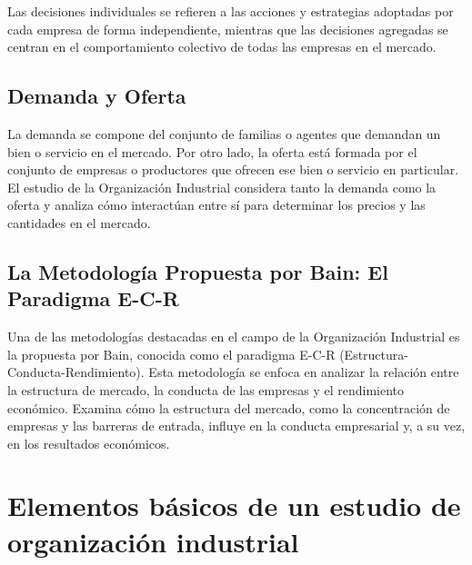 \documentclass[
  letterpaper,
  DIV=11,
  numbers=noendperiod]{scrartcl}
\begin{document}
Las decisiones individuales se refieren a las acciones y estrategias
adoptadas por cada empresa de forma independiente, mientras que las
decisiones agregadas se centran en el comportamiento colectivo de todas
las empresas en el mercado.

\hypertarget{demanda-y-oferta}{%
\subsection{Demanda y Oferta}\label{demanda-y-oferta}}

La demanda se compone del conjunto de familias o agentes que demandan un
bien o servicio en el mercado. Por otro lado, la oferta está formada por
el conjunto de empresas o productores que ofrecen ese bien o servicio en
particular. El estudio de la Organización Industrial considera tanto la
demanda como la oferta y analiza cómo interactúan entre sí para
determinar los precios y las cantidades en el mercado.

\hypertarget{la-metodologuxeda-propuesta-por-bain-el-paradigma-e-c-r}{%
\subsection{La Metodología Propuesta por Bain: El Paradigma
E-C-R}\label{la-metodologuxeda-propuesta-por-bain-el-paradigma-e-c-r}}

Una de las metodologías destacadas en el campo de la Organización
Industrial es la propuesta por Bain, conocida como el paradigma E-C-R
(Estructura-Conducta-Rendimiento). Esta metodología se enfoca en
analizar la relación entre la estructura de mercado, la conducta de las
empresas y el rendimiento económico. Examina cómo la estructura del
mercado, como la concentración de empresas y las barreras de entrada,
influye en la conducta empresarial y, a su vez, en los resultados
económicos.

\hypertarget{elementos-buxe1sicos-de-un-estudio-de-organizaciuxf3n-industrial}{%
\section{Elementos básicos de un estudio de organización
industrial}\label{elementos-buxe1sicos-de-un-estudio-de-organizaciuxf3n-industrial}}
\end{document}

